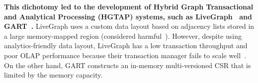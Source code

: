 
\textbf{This dichotomy led to the development of Hybrid Graph Transactional and Analytical Processing (HGTAP) systems, such as LiveGraph~\cite{zhu2019livegraph} and GART~\cite{shen2023bridging}.}
LiveGraph uses a custom data layout based on adjacency lists stored in a large memory-mapped region (considered harmful~\cite{crotty2022you}).
However, despite using analytics-friendly data layout, LiveGraph has a low transaction throughput and poor OLAP performance because their transaction manager fails to scale well~\cite{libinzhou2025GTX}.
On the other hand, GART constructs an in-memory multi-versioned CSR that is limited by the memory capacity.

